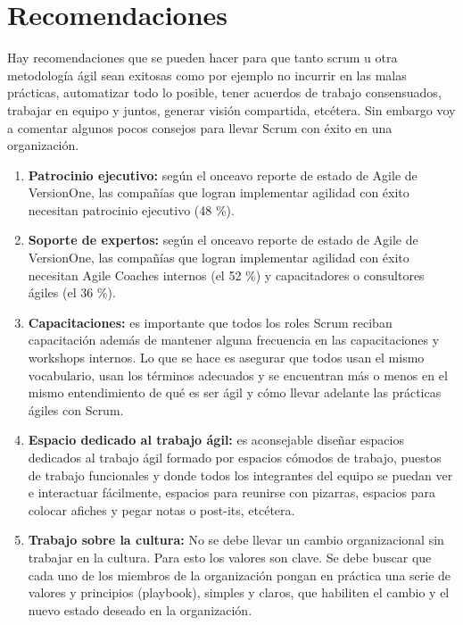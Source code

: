\section{Recomendaciones}

Hay recomendaciones que se pueden hacer para que tanto scrum u otra metodología ágil sean exitosas como por ejemplo no incurrir en las malas prácticas, automatizar todo lo posible, tener acuerdos de trabajo consensuados, trabajar en equipo y juntos, generar visión compartida, etcétera. Sin embargo voy a comentar algunos pocos consejos para llevar Scrum con éxito en una organización.

\begin{enumerate}
\item \textbf{Patrocinio ejecutivo:} según el onceavo reporte de estado de Agile de VersionOne, las compañías que logran implementar agilidad con éxito necesitan patrocinio ejecutivo (48 \%).

\item \textbf{Soporte de expertos:} según el onceavo reporte de estado de Agile de VersionOne, las compañías que logran implementar agilidad con éxito necesitan Agile Coaches internos (el 52 \%) y capacitadores o consultores ágiles (el 36 \%).

\item \textbf{Capacitaciones:} es importante que todos los roles Scrum reciban capacitación además de mantener alguna frecuencia en las capacitaciones y workshops internos. Lo que se hace es asegurar que todos usan el mismo vocabulario, usan los términos adecuados y se encuentran más o menos en el mismo entendimiento de qué es ser ágil y cómo llevar adelante las prácticas ágiles con Scrum.

\item \textbf{Espacio dedicado al trabajo ágil:} es aconsejable diseñar espacios dedicados al trabajo ágil formado por espacios cómodos de trabajo, puestos de trabajo funcionales y donde todos los integrantes del equipo se puedan ver e interactuar fácilmente, espacios para reunirse con pizarras, espacios para colocar afiches y pegar notas o post-its, etcétera. 

\item \textbf{Trabajo sobre la cultura:} No se debe llevar un cambio organizacional sin trabajar en la cultura. Para esto los valores son clave. Se debe buscar que cada uno de los miembros de la organización pongan en práctica una serie de valores y principios (playbook), simples y claros, que habiliten el cambio y el nuevo estado deseado en la organización.

\end{enumerate}

